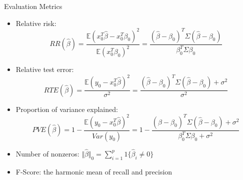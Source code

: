 \documentclass[blue, 10pt]{beamer}
\begin{document}
\begin{frame}{Evaluation Metrics}

  \begin{itemize}
    \item Relative risk:
    $$RR(\hat{\beta}) = \frac{\mathbb{E}(x_0^T \hat{\beta} - x_0^T \beta_0)^2}{\mathbb{E}(x_0^T \beta_0)^2} = \frac{(\hat{\beta} - \beta_0)^T \Sigma (\hat{\beta} - \beta_0)}{\beta_0^T \Sigma \beta_0}$$
    \item Relative test error:
    $$RTE(\hat{\beta}) = \frac{\mathbb{E}(y_0 - x_0^T \hat{\beta})^2}{\sigma^2} = \frac{(\hat{\beta} - \beta_0)^T \Sigma (\hat{\beta} - \beta_0) + \sigma^2}{\sigma^2}$$
    \item Proportion of variance explained:
    $$PVE(\hat{\beta}) = 1 - \frac{\mathbb{E}(y_0 - x_0^T \hat{\beta})^2}{Var(y_0)} = 1 - \frac{(\hat{\beta} - \beta_0)^T \Sigma (\hat{\beta} - \beta_0) + \sigma^2 }{\beta_0^T \Sigma \beta_0 + \sigma^2}$$
    \item Number of nonzeros: $\Vert \hat{\beta} \Vert_0 = \sum_{i=1}^p 1\{\hat{\beta}_i \ne 0\}$
    \item F-Score: the harmonic mean of recall and precision
  \end{itemize}

\end{frame}
\end{document}
